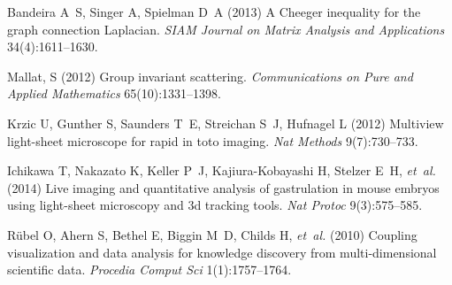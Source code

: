 \documentclass{pnastwo}
\begin{document}
\begin{article}
\begin{thebibliography}{10}
Bandeira A~S, Singer A, Spielman D~A (2013) A Cheeger inequality for the graph connection Laplacian. \textit{SIAM Journal on Matrix Analysis and Applications} 34(4):1611--1630.

Mallat, S (2012) Group invariant scattering. 
\textit{Communications on Pure and Applied Mathematics}
65(10):1331--1398.

Krzic U, Gunther S, Saunders T~E, Streichan S~J, Hufnagel L (2012) Multiview
  light-sheet microscope for rapid in toto imaging. \textit{Nat Methods}
  9(7):730--733.

Ichikawa T, Nakazato K, Keller P~J, Kajiura-Kobayashi H, Stelzer E~H,
  \textit{et~al.} (2014) Live imaging and quantitative analysis of gastrulation
  in mouse embryos using light-sheet microscopy and 3d tracking tools.
  \textit{Nat Protoc} 9(3):575--585.

R{\"u}bel O, Ahern S, Bethel E, Biggin M~D, Childs H, \textit{et~al.} (2010)
  Coupling visualization and data analysis for knowledge discovery from
  multi-dimensional scientific data. \textit{Procedia Comput Sci}
  1(1):1757--1764.

\end{thebibliography}



\end{article}
\end{document}
